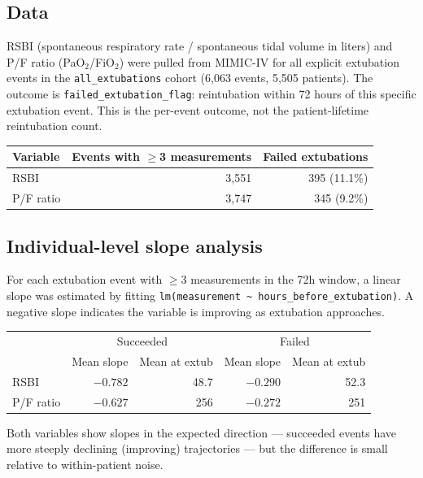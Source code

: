 \documentclass[11pt]{article}
\begin{document}
\subsection{Data}

RSBI (spontaneous respiratory rate / spontaneous tidal volume in liters)
and P/F ratio (PaO$_2$/FiO$_2$) were pulled from MIMIC-IV for all explicit
extubation events in the \texttt{all\_extubations} cohort (6,063 events,
5,505 patients). The outcome is \texttt{failed\_extubation\_flag}: reintubation
within 72 hours of this specific extubation event. This is the per-event
outcome, not the patient-lifetime reintubation count.

\begin{center}
\begin{tabular}{lrr}
\toprule
Variable & Events with $\geq$3 measurements & Failed extubations \\
\midrule
RSBI & 3,551 & 395 (11.1\%) \\
P/F ratio & 3,747 & 345 (9.2\%) \\
\bottomrule
\end{tabular}
\end{center}

\subsection{Individual-level slope analysis}

For each extubation event with $\geq$3 measurements in the 72h window,
a linear slope was estimated by fitting \texttt{lm(measurement \textasciitilde{}
hours\_before\_extubation)}. A negative slope indicates the variable is
improving as extubation approaches.

\begin{center}
\begin{tabular}{lrrrr}
\toprule
 & \multicolumn{2}{c}{Succeeded} & \multicolumn{2}{c}{Failed} \\
 & Mean slope & Mean at extub & Mean slope & Mean at extub \\
\midrule
RSBI & $-0.782$ & 48.7 & $-0.290$ & 52.3 \\
P/F ratio & $-0.627$ & 256 & $-0.272$ & 251 \\
\bottomrule
\end{tabular}
\end{center}

\noindent Both variables show slopes in the expected direction --- succeeded
events have more steeply declining (improving) trajectories --- but the
difference is small relative to within-patient noise.
\end{document}
